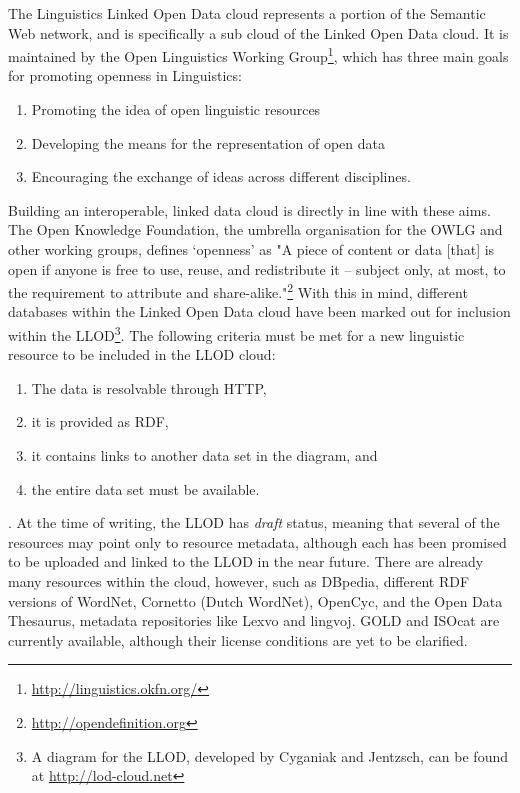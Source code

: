 The Linguistics Linked Open Data cloud represents a portion of the Semantic Web network, and is specifically a sub cloud of the Linked Open Data cloud. It is maintained by the Open Linguistics Working Group\footnote{\url{http://linguistics.okfn.org/}}, which has three main goals for promoting openness in Linguistics: \\
\begin{enumerate} \item Promoting the idea of open linguistic resources \item Developing the means for the representation of open data \item Encouraging the exchange of ideas across different disciplines. \end{enumerate}
Building an interoperable, linked data cloud is directly in line with these aims. The Open Knowledge Foundation, the umbrella organisation for the OWLG and other working groups, defines `openness' as "A piece of content or data [that] is open if anyone is free to use, reuse, and redistribute it -- subject only, at most, to the requirement to attribute and share-alike."\footnote{\url{http://opendefinition.org}} With this in mind, different databases within the Linked Open Data cloud have been marked out for inclusion within the LLOD\footnote{A diagram for the LLOD, developed by Cyganiak and Jentzsch, can be found at \url{http://lod-cloud.net}}. The following criteria must be met for a new linguistic resource to be included in the LLOD cloud: \begin{enumerate}\item The data is resolvable through HTTP, \item it is provided as RDF, \item it contains links to another data set in the diagram, and \item the entire data set must be available.\end{enumerate}. At the time of writing, the LLOD has {\it draft} status, meaning that several of the resources may point only to resource metadata, although each has been promised to be uploaded and linked to the LLOD in the near future. There are already many resources within the cloud, however, such as DBpedia, different RDF versions of WordNet, Cornetto (Dutch WordNet), OpenCyc, and the Open Data Thesaurus, metadata repositories like Lexvo and lingvoj. GOLD and ISOcat are currently available, although their license conditions are yet to be clarified. 

